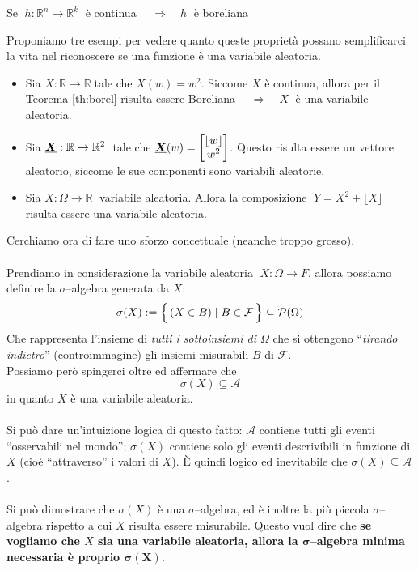 \begin{teorema}
\label{th:borel}
    Se $\;h:\mathbb{R}^n\to\mathbb{R}^k\;$ è continua $\quad\Rightarrow\quad h\;$ è boreliana
\end{teorema}

\begin{esempio}
Proponiamo tre esempi per vedere quanto queste proprietà possano semplificarci la vita nel riconoscere se una funzione è una variabile aleatoria.
    \begin{itemize} 
        \item Sia $X:\mathbb{R}\to\mathbb{R}\;$tale che $X(w) = w^2$. Siccome $X$ è continua, allora per il Teorema \ref{th:borel} risulta essere Boreliana $\quad\Rightarrow\quad X\;$ è una variabile aleatoria.
        
        \item Sia $\underline{{\boldsymbol{X}}}:\mathbb{R}\to\mathbb{R}^2\;$ tale che $\underline{{\boldsymbol{X}}}(w)= \begin{bmatrix}\lfloor w\rfloor \\ w^2\end{bmatrix}$. Questo risulta essere un vettore aleatorio, siccome le sue componenti sono variabili aleatorie.

        \item Sia $X:\Omega\to\mathbb{R}\;$ variabile aleatoria. Allora la composizione $\;Y = X^2 + \lfloor X\rfloor\;$ risulta essere una variabile aleatoria.
    \end{itemize}
\end{esempio}
\bigskip
\noindent Cerchiamo ora di fare uno sforzo concettuale (neanche troppo grosso).\\
\\
Prendiamo in considerazione la variabile aleatoria $\;X:\Omega\to F$, allora possiamo definire la $\sigma$--algebra generata da $X$:
\[\sigma(X) := \Bigl\{\,(X\in B) \mid B\in\mathcal{F}\,\Bigr\}\subseteq \mathcal{P}(\Omega)\]
Che rappresenta l'insieme di \emph{tutti i sottoinsiemi di $\Omega$} che si ottengono
``\emph{tirando indietro}'' (controimmagine) gli insiemi misurabili $B$ di $\mathcal{F}$. \label{sigma(X)}\\
Possiamo però spingerci oltre ed affermare che
\[\sigma(X)\subseteq\mathcal{A}\]
in quanto $X$ è una variabile aleatoria.\\
\\
Si può dare un'intuizione logica di questo fatto: $\mathcal{A}$ contiene tutti gli eventi ``osservabili nel mondo''; $\sigma(X)$ contiene solo gli eventi descrivibili in funzione di $X$ (cioè “attraverso” i valori di $X$). È quindi logico ed inevitabile che $\sigma(X)\subseteq\mathcal{A}$.\\
\\
Si può dimostrare che $\sigma(X)$ è una $\sigma$--algebra, ed è inoltre la più piccola $\sigma$--algebra rispetto a cui $X$ risulta essere misurabile. Questo vuol dire che \textbf{se vogliamo che $X$ sia una variabile aleatoria, allora la $\boldsymbol{\sigma}$--algebra minima necessaria è proprio $\boldsymbol{\sigma(X)}$}.

